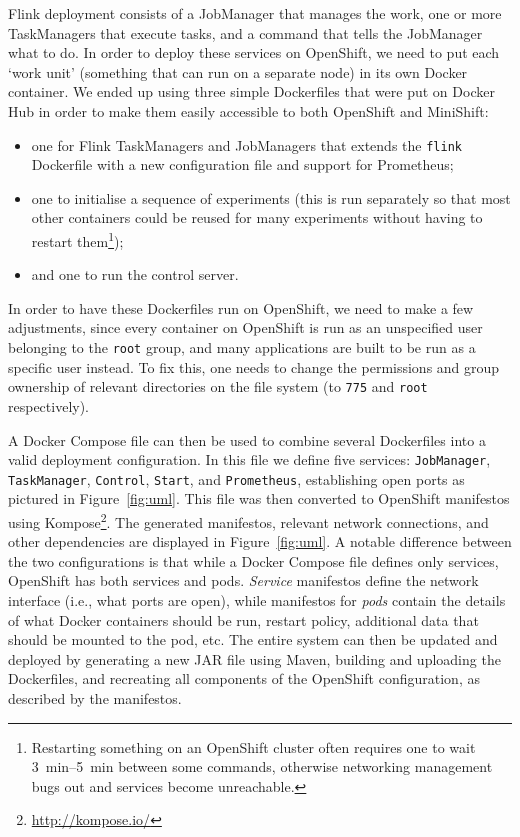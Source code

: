 \documentclass{article}
\begin{document}
Flink deployment consists of a JobManager that manages the work, one or more
TaskManagers that execute tasks, and a command that tells the JobManager what to
do. In order to deploy these services on OpenShift, we need to put each `work
unit' (something that can run on a separate node) in its own Docker container.
We ended up using three simple Dockerfiles that were put on Docker Hub in order
to make them easily accessible to both OpenShift and MiniShift:
\begin{itemize}
\item one for Flink TaskManagers and JobManagers that extends the \texttt{flink}
  Dockerfile with a new configuration file and support for Prometheus;
\item one to initialise a sequence of experiments (this is run
    separately so that most other containers could be reused for many
    experiments without having to restart them\footnote{Restarting something on
      an OpenShift cluster often requires one to wait
      \SIrange[range-phrase=--,range-units=single]{3}{5}{\minute} between some
      commands, otherwise networking management bugs out and services become
      unreachable.});
  \item and one to run the control server.
\end{itemize}

In order to have these Dockerfiles run on OpenShift, we need to make a few
adjustments, since every container on OpenShift is run as an unspecified user
belonging to the \texttt{root} group, and many applications are built to be run
as a specific user instead. To fix this, one needs to change the permissions and
group ownership of relevant directories on the file system (to \texttt{775} and
\texttt{root} respectively).

A Docker Compose file can then be used to combine several Dockerfiles into a
valid deployment configuration. In this file we define five services:
\texttt{JobManager}, \texttt{TaskManager}, \texttt{Control}, \texttt{Start}, and
\texttt{Prometheus}, establishing open ports as pictured in
Figure~\ref{fig:uml}. This file was then converted to OpenShift manifestos using
Kompose\footnote{\url{http://kompose.io/}}. The generated manifestos, relevant
network connections, and other dependencies are displayed in
Figure~\ref{fig:uml}. A notable difference between the two configurations is
that while a Docker Compose file defines only services, OpenShift has both
services and pods. \emph{Service} manifestos define the network interface (i.e.,
what ports are open), while manifestos for \emph{pods} contain the details of
what Docker containers should be run, restart policy, additional data that
should be mounted to the pod, etc. The entire system can then be updated and
deployed by generating a new JAR file using Maven, building and uploading the
Dockerfiles, and recreating all components of the OpenShift configuration, as
described by the manifestos.
\end{document}
